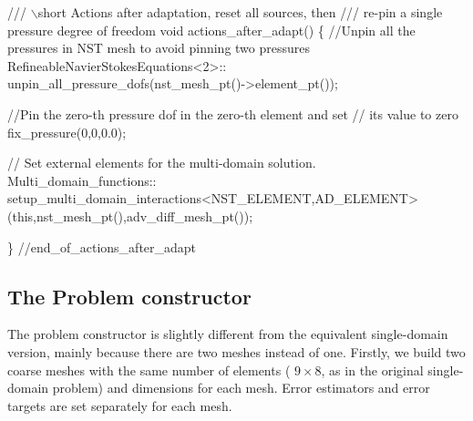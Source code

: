 \begin{DoxyCodeInclude}
 \textcolor{comment}{/// \(\backslash\)short Actions after adaptation, reset all sources, then}
\textcolor{comment}{ /// re-pin a single pressure degree of freedom}
\textcolor{comment}{} \textcolor{keywordtype}{void} actions\_after\_adapt()
  \{
   \textcolor{comment}{//Unpin all the pressures in NST mesh to avoid pinning two pressures}
   RefineableNavierStokesEquations<2>::
    unpin\_all\_pressure\_dofs(nst\_mesh\_pt()->element\_pt());

   \textcolor{comment}{//Pin the zero-th pressure dof in the zero-th element and set}
   \textcolor{comment}{// its value to zero}
   fix\_pressure(0,0,0.0);

   \textcolor{comment}{// Set external elements for the multi-domain solution.}
   Multi\_domain\_functions::
    setup\_multi\_domain\_interactions<NST\_ELEMENT,AD\_ELEMENT>
    (\textcolor{keyword}{this},nst\_mesh\_pt(),adv\_diff\_mesh\_pt());
 
  \} \textcolor{comment}{//end\_of\_actions\_after\_adapt}

\end{DoxyCodeInclude}




\hypertarget{index_constructor}{}\subsection{The Problem constructor}\label{index_constructor}
The problem constructor is slightly different from the equivalent single-\/domain version, mainly because there are two meshes instead of one. Firstly, we build two coarse meshes with the same number of elements ( $ 9 \times 8 $, as in the original single-\/domain problem) and dimensions for each mesh. Error estimators and error targets are set separately for each mesh.

